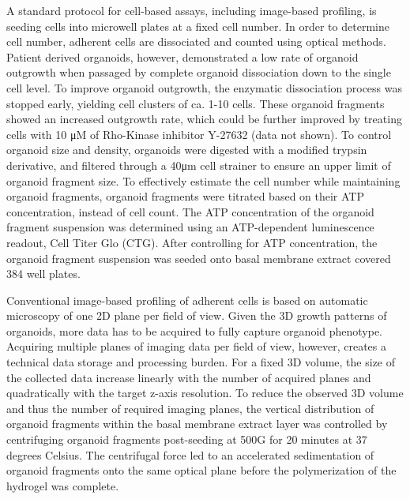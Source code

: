 \begin{flushleft}
A standard protocol for cell-based assays, including image-based profiling, is seeding cells into microwell plates at a fixed cell number. In order to determine cell number, adherent cells are dissociated and counted using optical methods. Patient derived organoids, however, demonstrated a low rate of organoid outgrowth when passaged by complete organoid dissociation down to the single cell level. To improve organoid outgrowth, the enzymatic dissociation process was stopped early, yielding cell clusters of ca. 1-10 cells. These organoid fragments showed an increased outgrowth rate, which could be further improved by treating cells with 10 μM of Rho-Kinase inhibitor Y-27632 (data not shown). To control organoid size and density, organoids were digested with a modified trypsin derivative, and filtered through a 40μm cell strainer to ensure an upper limit of organoid fragment size. To effectively estimate the cell number while maintaining organoid fragments, organoid fragments were titrated based on their ATP concentration, instead of cell count. The ATP concentration of the organoid fragment suspension was determined using an ATP-dependent luminescence readout, Cell Titer Glo (CTG). After controlling for ATP concentration, the organoid fragment suspension was seeded onto basal membrane extract covered 384 well plates.
\bigbreak

Conventional image-based profiling of adherent cells is based on automatic microscopy of one 2D plane per field of view. Given the 3D growth patterns of organoids, more data has to be acquired to fully capture organoid phenotype. Acquiring multiple planes of imaging data per field of view, however, creates a technical data storage and processing burden. For a fixed 3D volume, the size of the collected data increase linearly with the number of acquired planes and quadratically with the target z-axis resolution. To reduce the observed 3D volume and thus the number of required imaging planes, the vertical distribution of organoid fragments within the basal membrane extract layer was controlled by centrifuging organoid fragments post-seeding at 500G for 20 minutes at 37 degrees Celsius. The centrifugal force led to an accelerated sedimentation of organoid fragments onto the same optical plane before the polymerization of the hydrogel was complete.
\bigbreak


\end{flushleft}
